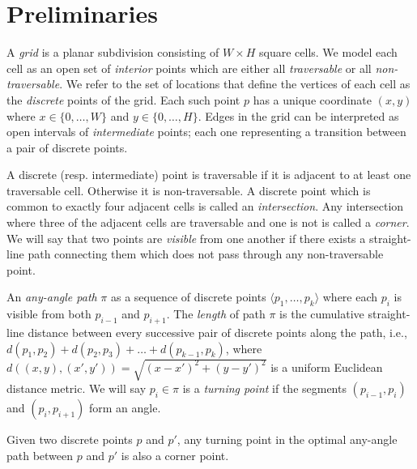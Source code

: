 \section{Preliminaries}
A \emph{grid} is a planar subdivision consisting of $W \times H$ square cells.
We model each cell as an open set of \emph{interior} points which are 
either all \emph{traversable} or all \emph{non-traversable}.
We refer to the set of locations that define the vertices of each cell as the 
\emph{discrete} points of the grid. Each such point $p$ has a unique coordinate $(x, y)$
where $x \in \{0,\dots,W\}$ and $y \in \{0,\dots,H\}$.
Edges in the grid can be interpreted as open intervals of \emph{intermediate}
points; each one representing a transition between a pair of discrete points. 
\par
A discrete (resp. intermediate) point is traversable if it is adjacent to 
at least one traversable cell. Otherwise it is non-traversable.
A discrete point which is common to exactly four adjacent cells is called an \emph{intersection}.
Any intersection where three of the adjacent cells are traversable and one is not
is called a \emph{corner}.
We will say that two points are \emph{visible} from one another if there exists a 
straight-line path connecting them which does not pass through any non-traversable point.

An \emph{any-angle path} $\pi$ as a sequence of discrete points 
$\langle p_1,\dots,p_k \rangle$ where each $p_{i}$ is visible from both $p_{i-1}$
and $p_{i+1}$.
The \emph{length} of path $\pi$ 
is the cumulative straight-line distance between every successive
pair of discrete points along the path, 
i.e., $d(p_1,p_2) + d(p_2,p_3) + \dots + d(p_{k-1},p_k)$, 
where $d((x,y), (x',y'))= \sqrt{(x-x')^2 + (y-y')^2}$ 
is a uniform Euclidean distance metric.
We will say $p_i \in \pi$ is a \emph{turning point} if the segments
$(p_{i-1}, p_i)$ and $(p_i, p_{i+1})$ form an angle.
\\
\begin{lemm}
\label{lemma::corner}
  Given two discrete points $p$ and $p'$, 
  any turning point in the optimal any-angle path between $p$ and $p'$ 
  is also a corner point.
\end{lemm}


